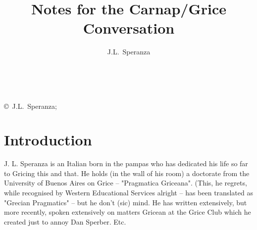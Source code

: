 \documentclass[10pt,titlepage]{book}
\title{Notes for the Carnap/Grice Conversation}
\author{J.L.~Speranza}
\date{\ }
\newcommand{\ignore}[1]{}
\begin{document}
\frontmatter
                               
\begin{titlepage}
\maketitle

\vfill


\vfill

\begin{centering}

\vfill

\footnotesize{
\ignore{
Started 2010-02

Last Change $ $Date: 2010/02/15 22:24:44 $ $


Draft $ $Id: GriceCompanion.tex,v 1.2 2010/02/15 22:24:44 rbj Exp $ $
}
\copyright\ J.L.~Speranza;

}%


\end{centering}

\end{titlepage}

\setcounter{tocdepth}{4}
{\parskip-0pt\tableofcontents}

\mainmatter

\ignore{Bibliography test:
\cite{grice41}
\cite{grice86}
\cite{grice87}
\cite{grice88}
\cite{grice89}
\cite{grice91}
\cite{grice01}
\cite{grice57}
\cite{speranza89}
\cite{speranza91a}
\cite{speranza91b}
\cite{speranza95}
}%

\chapter{Introduction}

J. L. Speranza is an Italian born in the pampas who has dedicated his life  
so far to Gricing this and that. He holds (in the wall of his room) a 
doctorate  from the University of Buenos Aires on Grice -- "Pragmatica Griceana". 
(This, he  regrets, while recognised by Western Educational Services 
alright -- has been  translated as "Grecian Pragmatics" -- but he don't (sic) 
mind.  He has  written extensively, but more recently, spoken extensively on 
matters Gricean at  the Grice Club which he created just to annoy Dan Sperber.  
Etc.
\end{document}
